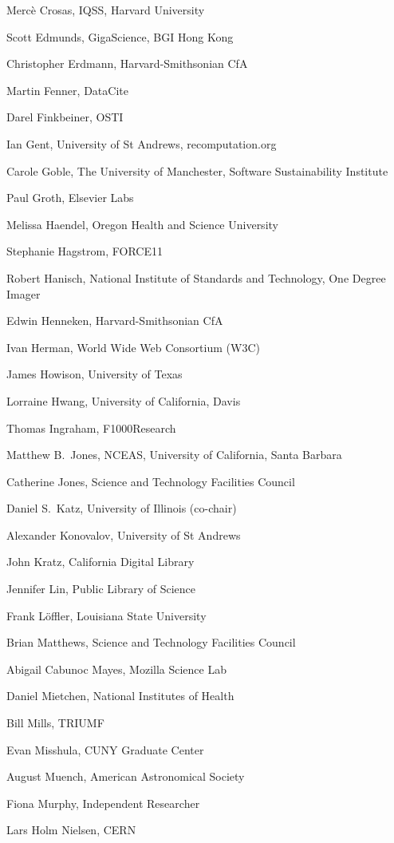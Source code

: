 \documentclass[12pt, oneside]{amsart}
\begin{document}
Merc\`e Crosas, IQSS, Harvard University

Scott Edmunds, GigaScience, BGI Hong Kong

Christopher Erdmann, Harvard-Smithsonian CfA

Martin Fenner, DataCite

Darel Finkbeiner, OSTI

Ian Gent, University of St Andrews, recomputation.org

Carole Goble, The University of Manchester, Software Sustainability Institute

Paul Groth, Elsevier Labs

Melissa Haendel, Oregon Health and Science University

Stephanie Hagstrom, FORCE11

Robert Hanisch, National Institute of Standards and Technology, One Degree Imager

Edwin Henneken, Harvard-Smithsonian CfA

Ivan Herman, World Wide Web Consortium (W3C)

James Howison, University of Texas

Lorraine Hwang, University of California,  Davis

Thomas Ingraham, F1000Research

Matthew B.~Jones, NCEAS, University of California,  Santa Barbara

Catherine Jones, Science and Technology Facilities Council

Daniel S.~Katz, University of Illinois (co-chair)

Alexander Konovalov, University of St Andrews

John Kratz, California Digital Library

Jennifer Lin, Public Library of Science

Frank L\"offler, Louisiana State University

Brian Matthews, Science and Technology Facilities Council

Abigail Cabunoc Mayes, Mozilla Science Lab

Daniel Mietchen, National Institutes of Health

Bill Mills, TRIUMF

Evan Misshula, CUNY Graduate Center

August Muench, American Astronomical Society

Fiona Murphy, Independent Researcher

Lars Holm Nielsen, CERN
\end{document}
